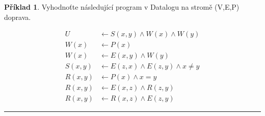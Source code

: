 \documentclass[a4paper]{article}
\theoremstyle{definition}
\newtheorem{priklad}{Příklad}
\begin{document}
\begin{priklad}
    Vyhodnoťte následující program v Datalogu na stromě (V,E,P) doprava.
    
    \begin{minipage}{0.48\textwidth}
      \begin{align*}
      U &\leftarrow S(x,y)\wedge W(x)\wedge W(y) \\
      W(x) &\leftarrow P(x) \\
      W(x) &\leftarrow E(x,y) \wedge W(y) \\
      S(x,y) &\leftarrow E(z,x)\wedge E(z,y)\wedge x\neq y \\
      R(x,y) &\leftarrow P(x)\wedge x=y \\
      R(x,y) &\leftarrow E(x,z)\wedge R(z,y) \\
      R(x,y) &\leftarrow R(x,z)\wedge E(z,y)
      \end{align*}
    \end{minipage}
    \hfill
    \begin{minipage}{0.3\textwidth}
    \end{minipage}
    
\noindent\rule{\linewidth}{.2pt}    
\end{priklad}
\end{document}
